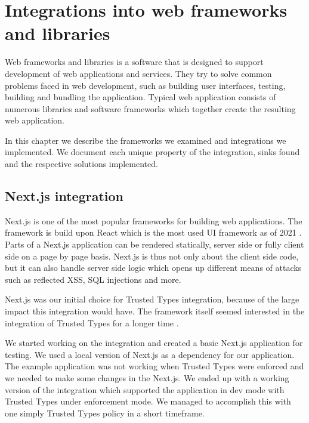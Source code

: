 \chapter{Integrations into web frameworks and libraries}

Web frameworks and libraries is a software that is designed to support development of web
applications and services. They try to solve common problems faced in web development, such as
building user interfaces, testing, building and bundling the application. Typical web application
consists of numerous libraries and software frameworks which together create the resulting web
application.

In this chapter we describe the frameworks we examined and integrations we implemented. We document
each unique property of the integration, sinks found and the respective solutions implemented.

\section{Next.js integration}
\label{intro-nextjs}

Next.js is one of the most popular frameworks for building web applications. The framework is build
upon React which is the most used UI framework as of 2021 \cite{react_most_used_2021}. Parts of a
Next.js application can be rendered statically, server side or fully client side on a page by page
basis. Next.js is thus not only about the client side code, but it can also handle server side logic
which opens up different means of attacks such as reflected XSS, SQL injections and more.

Next.js was our initial choice for Trusted Types integration, because of the large impact this
integration would have. The framework itself seemed interested in the integration of Trusted Types
for a longer time \cite{nextjs_tt_pr_2020}.

We started working on the integration and created a basic Next.js application for testing. We used a
local version of Next.js as a dependency for our application. The example application was not
working when Trusted Types were enforced and we needed to make some changes in the Next.js. We ended
up with a working version of the integration which supported the application in dev mode with
Trusted Types under enforcement mode. We managed to accomplish this with one simply Trusted Types
policy in a short timeframe.

